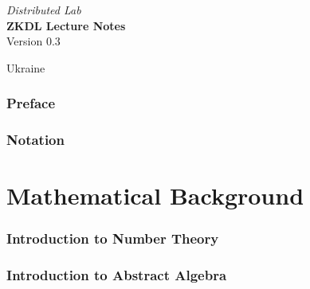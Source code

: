 \documentclass{zkdl-template}
\def\maketitle{
    \begin{center}
        {\Large\sffamily \emph{Distributed Lab}} \\ \vspace{30mm}
        {\huge\sffamily\bfseries ZKDL Lecture Notes} \\ \vspace{5mm}
        {Version 0.3} \\ \vspace{10mm}
    \end{center}
    
    \vfill

    \begin{center}
        {Ukraine} \\ \vspace{2mm}
        {\sffamily \the\year}
    \end{center}

    \thispagestyle{empty}
    \pagebreak
}
\begin{document}
    \maketitle


    \pagecolor{white}

    \vspace*{\fill}
    
    \begin{abstract}
        \fontsize{10}{12}\selectfont

        \vspace{5mm}

        
    \end{abstract}

    \vspace*{\fill}

    \thispagestyle{empty}
    \newpage


    \pagestyle{fancy}
    \pagecolor{white}

    \tableofcontents

    \pagebreak


    \section{Preface}
    

    \section{Notation}\label{section:notation}
    


    \part{Mathematical Background}
    

    \section{Introduction to Number Theory}\label{section:number-theory}
    

    \section{Introduction to Abstract Algebra}\label{section:abstract-algebra}
    
\end{document}
